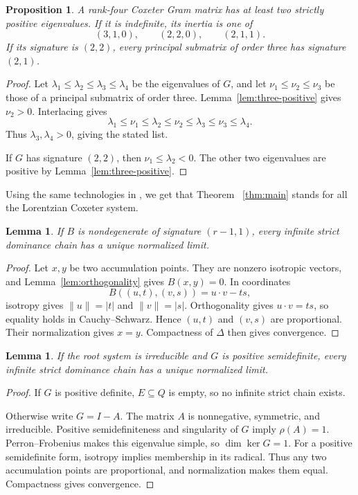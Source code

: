 \documentclass[11pt,reqno]{amsart}
\theoremstyle{plain}
\newtheorem{lemma}[theorem]{Lemma}
\newtheorem{proposition}[theorem]{Proposition}
\theoremstyle{definition}
\theoremstyle{remark}
\numberwithin{equation}{section}
\begin{document}
\begin{proposition}\label{prop:rank4-inertia}
A rank-four Coxeter Gram matrix has at least two strictly positive eigenvalues. If it is indefinite, its inertia is one of
\[
(3,1,0),\qquad(2,2,0),\qquad(2,1,1).
\]
If its signature is $(2,2)$, every principal submatrix of order three has signature $(2,1)$.
\end{proposition}
\begin{proof}
Let $\lambda_1\leq\lambda_2\leq\lambda_3\leq\lambda_4$ be the eigenvalues of $G$, and let $\nu_1\leq\nu_2\leq\nu_3$ be those of a principal submatrix of order three. Lemma~\ref{lem:three-positive} gives $\nu_2>0$. Interlacing gives
\[
\lambda_1\leq\nu_1\leq\lambda_2\leq\nu_2
\leq\lambda_3\leq\nu_3\leq\lambda_4.
\]
Thus $\lambda_3,\lambda_4>0$, giving the stated list.

If $G$ has signature $(2,2)$, then $\nu_1\leq\lambda_2<0$. The other two eigenvalues are positive by Lemma~\ref{lem:three-positive}.
\end{proof}
Using the same technologies in \cite{Cashen}, we get that Theorem ~\ref{thm:main} stands for all the Lorentzian Coxeter system.
\begin{lemma}\label{lem:lorentz}
If $B$ is nondegenerate of signature $(r-1,1)$, every infinite strict dominance chain has a unique normalized limit.
\end{lemma}
\begin{proof}
Let $x,y$ be two accumulation points. They are nonzero isotropic vectors, and Lemma~\ref{lem:orthogonality} gives $B(x,y)=0$. In coordinates
\[
B((u,t),(v,s))=u\cdot v-ts,
\]
isotropy gives $\|u\|=|t|$ and $\|v\|=|s|$. Orthogonality gives $u\cdot v=ts$, so equality holds in Cauchy--Schwarz. Hence $(u,t)$ and $(v,s)$ are proportional. Their normalization gives $x=y$. Compactness of $\Delta$ then gives convergence.
\end{proof}

\begin{lemma}\label{lem:psd}
If the root system is irreducible and $G$ is positive semidefinite, every infinite strict dominance chain has a unique normalized limit.
\end{lemma}
\begin{proof}
If $G$ is positive definite, $E\subseteq Q$ is empty, so no infinite strict chain exists.

Otherwise write $G=I-A$. The matrix $A$ is nonnegative, symmetric, and irreducible. Positive semidefiniteness and singularity of $G$ imply $\rho(A)=1$. Perron--Frobenius makes this eigenvalue simple, so $\dim\ker G=1$. For a positive semidefinite form, isotropy implies membership in its radical. Thus any two accumulation points are proportional, and normalization makes them equal. Compactness gives convergence.
\end{proof}
\end{document}
